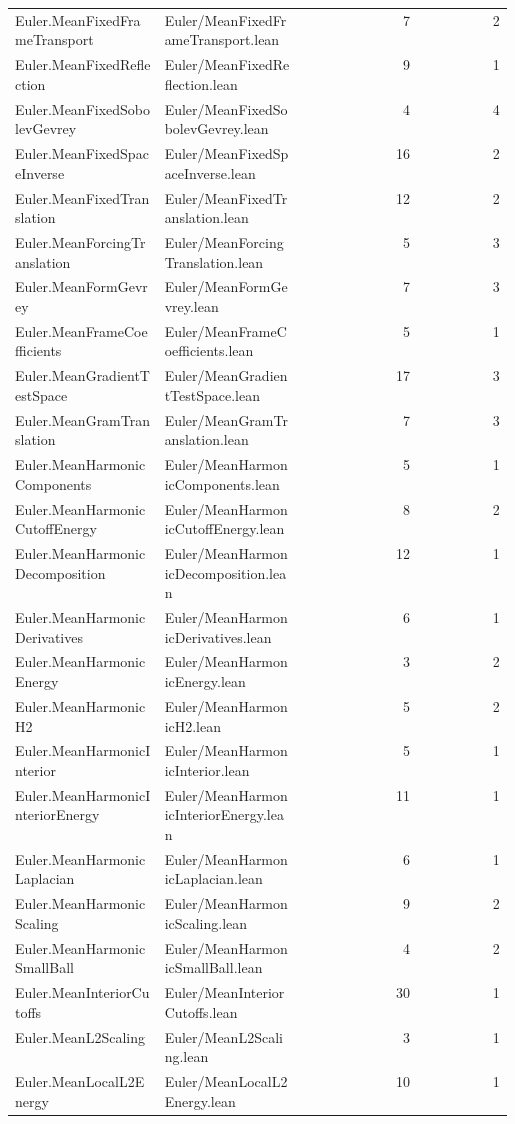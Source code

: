 \begin{longtable}{p{0.30\linewidth}p{0.28\linewidth}rr}
Euler.MeanFixedFrameTransport & Euler/MeanFixedFrameTransport.lean & 7 & 2\\
Euler.MeanFixedReflection & Euler/MeanFixedReflection.lean & 9 & 1\\
Euler.MeanFixedSobolevGevrey & Euler/MeanFixedSobolevGevrey.lean & 4 & 4\\
Euler.MeanFixedSpaceInverse & Euler/MeanFixedSpaceInverse.lean & 16 & 2\\
Euler.MeanFixedTranslation & Euler/MeanFixedTranslation.lean & 12 & 2\\
Euler.MeanForcingTranslation & Euler/MeanForcingTranslation.lean & 5 & 3\\
Euler.MeanFormGevrey & Euler/MeanFormGevrey.lean & 7 & 3\\
Euler.MeanFrameCoefficients & Euler/MeanFrameCoefficients.lean & 5 & 1\\
Euler.MeanGradientTestSpace & Euler/MeanGradientTestSpace.lean & 17 & 3\\
Euler.MeanGramTranslation & Euler/MeanGramTranslation.lean & 7 & 3\\
Euler.MeanHarmonicComponents & Euler/MeanHarmonicComponents.lean & 5 & 1\\
Euler.MeanHarmonicCutoffEnergy & Euler/MeanHarmonicCutoffEnergy.lean & 8 & 2\\
Euler.MeanHarmonicDecomposition & Euler/MeanHarmonicDecomposition.lean & 12 & 1\\
Euler.MeanHarmonicDerivatives & Euler/MeanHarmonicDerivatives.lean & 6 & 1\\
Euler.MeanHarmonicEnergy & Euler/MeanHarmonicEnergy.lean & 3 & 2\\
Euler.MeanHarmonicH2 & Euler/MeanHarmonicH2.lean & 5 & 2\\
Euler.MeanHarmonicInterior & Euler/MeanHarmonicInterior.lean & 5 & 1\\
Euler.MeanHarmonicInteriorEnergy & Euler/MeanHarmonicInteriorEnergy.lean & 11 & 1\\
Euler.MeanHarmonicLaplacian & Euler/MeanHarmonicLaplacian.lean & 6 & 1\\
Euler.MeanHarmonicScaling & Euler/MeanHarmonicScaling.lean & 9 & 2\\
Euler.MeanHarmonicSmallBall & Euler/MeanHarmonicSmallBall.lean & 4 & 2\\
Euler.MeanInteriorCutoffs & Euler/MeanInteriorCutoffs.lean & 30 & 1\\
Euler.MeanL2Scaling & Euler/MeanL2Scaling.lean & 3 & 1\\
Euler.MeanLocalL2Energy & Euler/MeanLocalL2Energy.lean & 10 & 1\\

\end{longtable}
